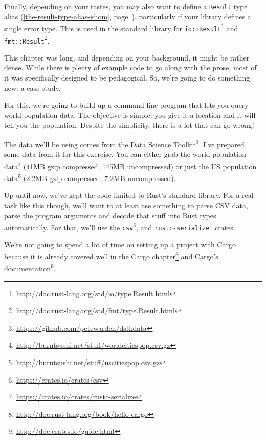 \documentclass[a4paper,]{book}
\renewcommand*{\hyperref}[2][\ar]{%
  \def\ar{#2}%
  #2 (\autoref{#1}, page~\pageref{#1})}
\renewcommand{\href}[2]{#2\footnote{\url{#1}}}
\begin{document}
Finally, depending on your tastes, you may also want to define a
\hyperref[the-result-type-alias-idiom]{\texttt{Result} type alias},
particularly if your library defines a single error type. This is used
in the standard library for
\href{http://doc.rust-lang.org/std/io/type.Result.html}{\texttt{io::Result}}
and
\href{http://doc.rust-lang.org/std/fmt/type.Result.html}{\texttt{fmt::Result}}.


This chapter was long, and depending on your background, it might be
rather dense. While there is plenty of example code to go along with the
prose, most of it was specifically designed to be pedagogical. So, we're
going to do something new: a case study.

For this, we're going to build up a command line program that lets you
query world population data. The objective is simple: you give it a
location and it will tell you the population. Despite the simplicity,
there is a lot that can go wrong!

The data we'll be using comes from the
\href{https://github.com/petewarden/dstkdata}{Data Science Toolkit}.
I've prepared some data from it for this exercise. You can either grab
the \href{http://burntsushi.net/stuff/worldcitiespop.csv.gz}{world
population data} (41MB gzip compressed, 145MB uncompressed) or just the
\href{http://burntsushi.net/stuff/uscitiespop.csv.gz}{US population
data} (2.2MB gzip compressed, 7.2MB uncompressed).

Up until now, we've kept the code limited to Rust's standard library.
For a real task like this though, we'll want to at least use something
to parse CSV data, parse the program arguments and decode that stuff
into Rust types automatically. For that, we'll use the
\href{https://crates.io/crates/csv}{\texttt{csv}}, and
\href{https://crates.io/crates/rustc-serialize}{\texttt{rustc-serialize}}
crates.


We're not going to spend a lot of time on setting up a project with
Cargo because it is already covered well in
\href{http://doc.rust-lang.org/book/hello-cargo}{the Cargo chapter} and
\href{http://doc.crates.io/guide.html}{Cargo's documentation}.
\end{document}
